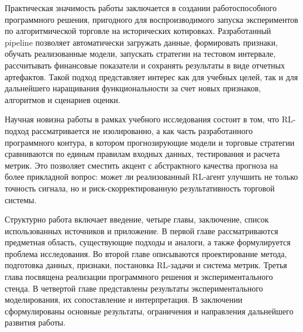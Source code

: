 Практическая значимость работы заключается в создании работоспособного программного решения, пригодного для воспроизводимого запуска экспериментов по алгоритмической торговле на исторических котировках. Разработанный pipeline позволяет автоматически загружать данные, формировать признаки, обучать реализованные модели, запускать стратегии на тестовом интервале, рассчитывать финансовые показатели и сохранять результаты в виде отчетных артефактов. Такой подход представляет интерес как для учебных целей, так и для дальнейшего наращивания функциональности за счет новых признаков, алгоритмов и сценариев оценки.

Научная новизна работы в рамках учебного исследования состоит в том, что RL-подход рассматривается не изолированно, а как часть разработанного программного контура, в котором прогнозирующие модели и торговые стратегии сравниваются по единым правилам входных данных, тестирования и расчета метрик. Это позволяет сместить акцент с абстрактного качества прогноза на более прикладной вопрос: может ли реализованный RL-агент улучшить не только точность сигнала, но и риск-скорректированную результативность торговой системы.

Структурно работа включает введение, четыре главы, заключение, список использованных источников и приложение. В первой главе рассматриваются предметная область, существующие подходы и аналоги, а также формулируется проблема исследования. Во второй главе описываются проектирование метода, подготовка данных, признаки, постановка RL-задачи и система метрик. Третья глава посвящена реализации программного решения и экспериментального стенда. В четвертой главе представлены результаты экспериментального моделирования, их сопоставление и интерпретация. В заключении сформулированы основные результаты, ограничения и направления дальнейшего развития работы.
